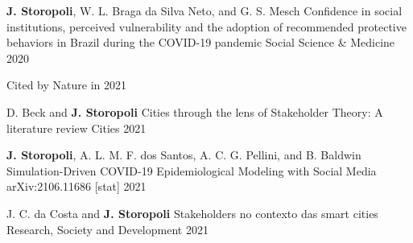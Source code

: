 

\begin{cventries}

  \cventry
    {\textbf{J. Storopoli}, W. L. Braga da Silva Neto, and G. S. Mesch} %
    {Confidence in social institutions, perceived vulnerability and the adoption of recommended protective behaviors in Brazil during the COVID-19 pandemic} %
    {Social Science & Medicine} %
    {2020} %
    {
      \begin{cvitems} %
        \item {Cited by Nature in 2021}
      \end{cvitems}
    }

  \cventry
    {D. Beck and \textbf{J. Storopoli}} %
    {Cities through the lens of Stakeholder Theory: A literature review} %
    {Cities} %
    {2021} %
    {}

  \cventry
    {\textbf{J. Storopoli}, A. L. M. F. dos Santos, A. C. G. Pellini, and B. Baldwin} %
    {Simulation-Driven COVID-19 Epidemiological Modeling with Social Media} %
    {arXiv:2106.11686 [stat]} %
    {2021} %
    {}

  \cventry
    {J. C. da Costa and \textbf{J. Storopoli}} %
    {Stakeholders no contexto das smart cities} %
    {Research, Society and Development} %
    {2021} %
    {}

\end{cventries}
